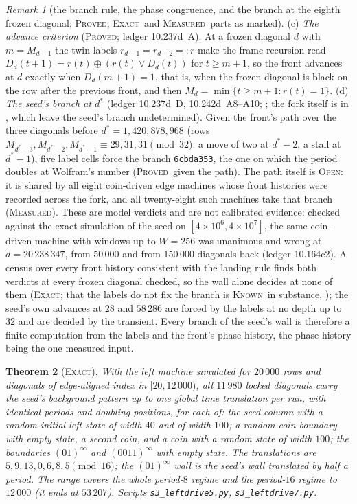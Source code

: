 \documentclass[11pt]{article}
\newtheorem{theorem}{Theorem}[section]
\theoremstyle{definition}
\theoremstyle{remark}
\newtheorem{remark}[theorem]{Remark}
\newcommand{\PROVED}{\textsc{Proved}}
\newcommand{\EXACT}{\textsc{Exact}}
\newcommand{\MEASURED}{\textsc{Measured}}
\newcommand{\KNOWN}{\textsc{Known}}
\newcommand{\OPEN}{\textsc{Open}}
\begin{document}
\begin{remark}[the branch rule, the phase congruence, and the branch at the eighth frozen diagonal; \PROVED, \EXACT\ and \MEASURED\ parts as marked]
(c) \emph{The advance criterion} (\PROVED; ledger 10.237d~A). At a frozen diagonal $d$ with $m=M_{d-1}$ the twin labels $r_{d-1}=r_{d-2}=:r$ make the frame recursion read $D_d(t+1)=r(t)\oplus(r(t)\vee D_d(t))$ for $t\ge m+1$, so the front advances at $d$ exactly when $D_d(m+1)=1$, that is, when the frozen diagonal is black on the row after the previous front, and then $M_d=\min\{t\ge m+1: r(t)=1\}$.
(d) \emph{The seed's branch at $d^{*}$} (ledger 10.237d~D, 10.242d~A8--A10; \cite[\S6]{WN}; the fork itself is in \cite{Dib,Pat}, which leave the seed's branch undetermined). Given the front's path over the three diagonals before $d^{*}=1{,}420{,}878{,}968$ (rows $M_{d^{*}-3},M_{d^{*}-2},M_{d^{*}-1}\equiv29,31,31\pmod{32}$: a move of two at $d^{*}-2$, a stall at $d^{*}-1$), five label cells force the branch \texttt{6cbda353}, the one on which the period doubles at Wolfram's number (\PROVED\ given the path). The path itself is \OPEN: it is shared by all eight coin-driven edge machines whose front histories were recorded across the fork, and all twenty-eight such machines take that branch (\MEASURED). These are model verdicts and are not calibrated evidence: checked against the exact simulation of the seed on $[4\times10^{6},4\times10^{7}]$, the same coin-driven machine with windows up to $W=256$ was unanimous and wrong at $d=20\,238\,347$, from $50\,000$ and from $150\,000$ diagonals back (ledger 10.164c2). A census over every front history consistent with the landing rule finds both verdicts at every frozen diagonal checked, so the wall alone decides at none of them (\EXACT; that the labels do not fix the branch is \KNOWN\ in substance, \cite{Rowland,Pat,Lania}); the seed's own advances at $28$ and $58\,286$ are forced by the labels at no depth up to $32$ and are decided by the transient. Every branch of the seed's wall is therefore a finite computation from the labels and the front's phase history, the phase history being the one measured input.
\end{remark}

\begin{theorem}[\EXACT]\label{fr:universaldata}
With the left machine simulated for $20\,000$ rows and diagonals of edge-aligned index in $[20,12\,000)$, all $11\,980$ locked diagonals carry the seed's background pattern up to one global time translation per run, with identical periods and doubling positions, for each of: the seed column with a random initial left state of width $40$ and of width $100$; a random-coin boundary with empty state, a second coin, and a coin with a random state of width $100$; the boundaries $(01)^\infty$ and $(0011)^\infty$ with empty state. The translations are $5,9,13,0,6,8,5 \pmod{16}$; the $(01)^\infty$ wall is the seed's wall translated by half a period. The range covers the whole period-$8$ regime and the period-$16$ regime to $12\,000$ (it ends at $53\,207$). Scripts \texttt{s3\_leftdrive5.py}, \texttt{s3\_leftdrive7.py}.
\end{theorem}
\end{document}
